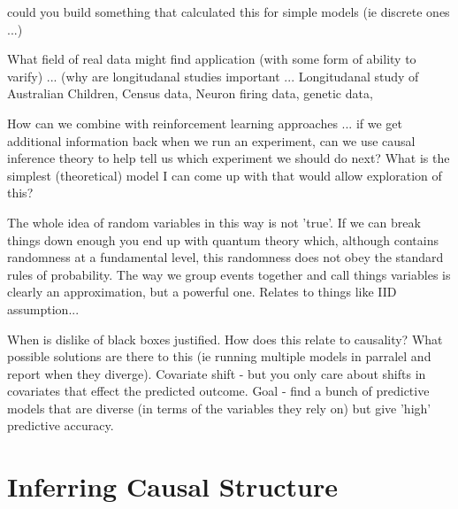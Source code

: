 \documentclass[11pt,a4paper]{article}
\begin{document}
could you build something that calculated this for simple models (ie discrete ones ...)

What field of real data might find application (with some form of ability to varify) ... (why are longitudanal studies important ... Longitudanal study of Australian Children, Census data, Neuron firing data, genetic data, 

How can we combine with reinforcement learning approaches ... if we get additional information back when we run an experiment, can we use causal inference theory to help tell us which experiment we should do next? What is the simplest (theoretical) model I can come up with that would allow exploration of this?

The whole idea of random variables in this way is not 'true'. If we can break things down enough you end up with quantum theory which, although contains randomness at a fundamental level, this randomness does not obey the standard rules of probability. The way we group events together and call things variables is clearly an approximation, but a powerful one. Relates to things like IID assumption...


When is dislike of black boxes justified. How does this relate to causality? What possible solutions are there to this (ie running multiple models in parralel and report when they diverge). Covariate shift - but you only care about shifts in covariates that effect the predicted outcome. Goal - find a bunch of predictive models that are diverse (in terms of the variables they rely on) but give 'high' predictive accuracy. 





\section*{Inferring Causal Structure}
\end{document}
